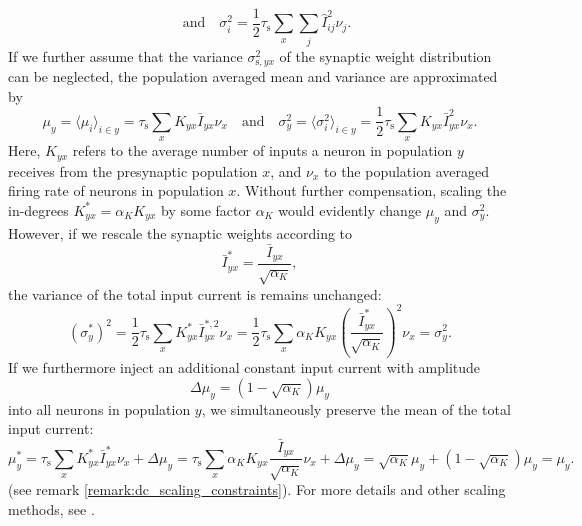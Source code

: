 \documentclass[10pt,a4paper,twoside,american]{article}
\theoremstyle{definitionstyle}
\newcommand{\tauS}{\tau_\text{s}}
\begin{document}
\begin{appendices}
\begin{enumerate}
\begin{equation}
      \quad\text{and}\quad
      \sigma_i^2 = \frac{1}{2} \tauS \sum_x \sum_j \hat{I}_{ij}^2 \nu_j  .
  \end{equation}
  If we further assume that the variance $\sigma_{\text{s},yx}^2$ of the synaptic weight distribution can be neglected, the population averaged mean and variance are approximated by
  \begin{equation}
    \label{eq:mean_and_variances_synaptic_input_pop_av}
    \mu_y      =\langle\mu_i\rangle_{i\in{}y}       = \tauS            \sum_x K_{yx}  \bar{I}_{yx}   \nu_x 
    \quad\text{and}\quad
    \sigma_y^2 = \langle\sigma_i^2\rangle_{i\in{}y}  = \frac{1}{2}\tauS \sum_x K_{yx} \bar{I}_{yx}^2 \nu_x  .
  \end{equation}
  Here, $K_{yx}$ refers to the average number of inputs a neuron in population $y$ receives from the presynaptic population $x$, and $\nu_x$ to the population averaged firing rate of neurons in population $x$.
  Without further compensation, scaling the in-degrees $K_{yx}^*=\alpha_K K_{yx}$ by some factor $\alpha_K$ would evidently change  $\mu_y$ and $\sigma_y^2$.
  However, if we rescale the synaptic weights according to
  \begin{equation}
    \bar{I}_{yx}^*=\frac{\bar{I}_{yx}}{\sqrt{\alpha_K}},
  \end{equation}
  the variance of the total input current is remains unchanged:
  \begin{equation}
    (\sigma_y^*)^2
    = \frac{1}{2}\tauS \sum_x K_{yx}^* \bar{I}_{yx}^{*,2} \nu_x
    = \frac{1}{2}\tauS \sum_x \alpha_K K_{yx} \left(\frac{\bar{I}_{yx}^*}{\sqrt{\alpha_K}}\right)^2 \nu_x
    = \sigma_y^2.
  \end{equation}
  If we furthermore inject an additional constant input current with amplitude
  \begin{equation}
   \Delta\mu_y = \left(1-\sqrt{\alpha_K}\right)  \mu_y 
  \end{equation}
  into all neurons in population $y$, we simultaneously preserve the mean of the total input current:
  \begin{equation}
    \mu_y^*
    = \tauS \sum_x K_{yx}^*  \bar{I}_{yx}^*   \nu_x + \Delta\mu_y
    = \tauS \sum_x \alpha_K K_{yx}  \frac{\bar{I}_{yx}}{\sqrt{\alpha_K}}   \nu_x +  \Delta\mu_y
    = \sqrt{\alpha_K} \mu_y  +  \left(1-\sqrt{\alpha_K}\right)  \mu_y
    =  \mu_y.
  \end{equation}
  (see remark \ref{remark:dc_scaling_constraints}).
  For more details and other scaling methods, see \citep{Albada15}.

\end{enumerate}
\end{appendices}
\end{document}
